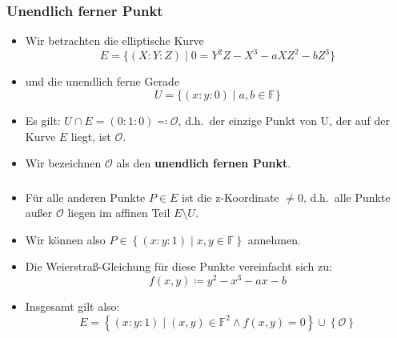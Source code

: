 \documentclass{beamer}
\theoremstyle{plain}
\theoremstyle{definition}
\theoremstyle{rem}
\newcommand{\patinf}{\mathcal{O}}
\begin{document}

\begin{frame}
\frametitle{Unendlich ferner Punkt}
\begin{itemize}[<+->]
	\item Wir betrachten die elliptische Kurve
		\begin{equation*}
			E=\{(X:Y:Z)\mid 0=Y^2Z - X^3 - aXZ^2 - bZ^3\}
		\end{equation*}
	\item und die unendlich ferne Gerade
	\begin{equation*}
			U=\{(x:y:0)\mid a,b\in\mathbb{F}\}
	\end{equation*}
	\item Es gilt: $U\cap E=(0:1:0)\eqqcolon\patinf$, d.h.\ der einzige Punkt von U, der auf der Kurve $E$ liegt, ist $\patinf$.
	\item Wir bezeichnen $\patinf$ als den \textbf{unendlich fernen Punkt}.
\end{itemize}
\end{frame}



\begin{frame}
\frametitle{ }
\begin{itemize}[<+->]
	\item Für alle anderen Punkte $P\in E$ ist die z-Koordinate $\ne 0$, d.h.\ alle Punkte außer $\patinf$ liegen im affinen Teil $E\setminus U$.
	\item Wir können also $P \in \left\{(x:y:1) \mid x,y \in \mathbb{F} \right\}$ annehmen.
	\item Die Weierstraß-Gleichung für diese Punkte vereinfacht sich zu:
	\begin{equation*}
    		f(x,y) \coloneqq y^2 - x^3 - ax - b
	\end{equation*}
	\item Insgesamt gilt also:
		\begin{equation*}
		E = \left\{(x:y:1) \mid (x,y) \in \mathbb{F}^2 \land f(x,y) = 0 \right\} \cup \left\{ \patinf \right\}
		\end{equation*}
\end{itemize}
\end{frame}

\end{document}
